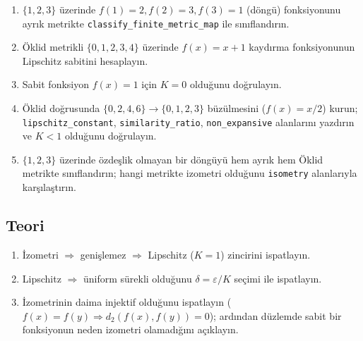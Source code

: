 \begin{enumerate}[label=K\arabic*.]
\item $\{1,2,3\}$ üzerinde $f(1)=2, f(2)=3, f(3)=1$ (döngü) fonksiyonunu ayrık
      metrikte \texttt{classify\_finite\_metric\_map} ile sınıflandırın.
\item Öklid metrikli $\{0,1,2,3,4\}$ üzerinde $f(x) = x+1$ kaydırma fonksiyonunun
      Lipschitz sabitini hesaplayın.
\item Sabit fonksiyon $f(x) = 1$ için $K=0$ olduğunu doğrulayın.
\item Öklid doğrusunda $\{0,2,4,6\} \to \{0,1,2,3\}$ büzülmesini ($f(x)=x/2$) kurun;
      \texttt{lipschitz\_constant}, \texttt{similarity\_ratio}, \texttt{non\_expansive}
      alanlarını yazdırın ve $K<1$ olduğunu doğrulayın.
\item $\{1,2,3\}$ üzerinde özdeşlik olmayan bir döngüyü hem ayrık hem Öklid
      metrikte sınıflandırın; hangi metrikte izometri olduğunu \texttt{isometry}
      alanlarıyla karşılaştırın.
\end{enumerate}

\subsection*{Teori}

\begin{enumerate}[label=T\arabic*.]
\item İzometri $\Rightarrow$ genişlemez $\Rightarrow$ Lipschitz ($K=1$) zincirini ispatlayın.
\item Lipschitz $\Rightarrow$ üniform sürekli olduğunu $\delta = \varepsilon/K$ seçimi
      ile ispatlayın.
\item İzometrinin daima injektif olduğunu ispatlayın ($f(x)=f(y) \Rightarrow
      d_2(f(x),f(y))=0$); ardından düzlemde sabit bir fonksiyonun neden izometri
      olamadığını açıklayın.
\end{enumerate}

